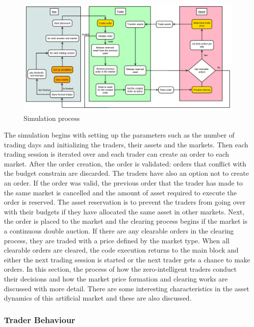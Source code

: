 \begin{figure}[H]
    \includegraphics[width=\linewidth]{diagrams/placement_clearing_process.png}
    \caption{Simulation process}
    \label{fig:sim_proc}
\end{figure}

The simulation begins with setting up the parameters such as the number of
trading days and initializing the traders, their assets and the markets.
Then each trading session is iterated over and each trader can create  
an order to each market. After the order creation, the order is validated: 
orders that conflict with the budget constrain are discarded.
The traders have also an option not to create an order. If the order was
valid, the previous order that the trader has made to the same market is cancelled 
and the amount of asset required to execute the order is reserved. The asset
reservation is to prevent the traders from going over with their budgets if they
have allocated the same asset in other markets. Next, the order is
placed to the market and the clearing process begins if the market is a 
continuous double auction. If there are any clearable orders in the clearing process,
they are traded with a price defined by the market type. When
all clearable orders are cleared, the code execution returns to the
main block and either the next trading session is started or the next
trader gets a chance to make orders. In this section, the process of how the
zero-intelligent traders conduct their decisions and how the 
market price formation and clearing works are discussed with more detail.
There are some interesting characteristics in the asset dynamics of this
artificial market and these are also discussed.

\subsubsection{Trader Behaviour}

